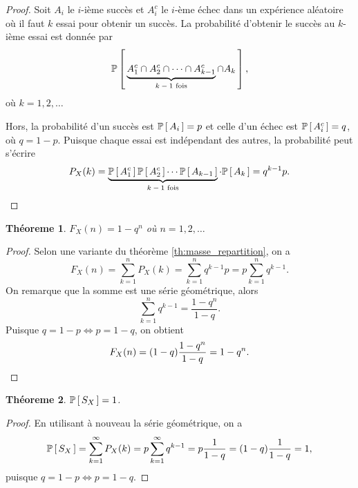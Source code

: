 \documentclass[11pt]{article}
\renewcommand\P[1]{%
	\ensuremath{%
		\mathbb{P}\left[\,#1\,\right]%
	}%
}%
\newtheorem{theoreme}{Théoreme}[section]
\begin{document}
\begin{proof}
	Soit $A_i$ le $i$-ième succès et $A_i^c$ le $i$-ème échec dans un
	expérience aléatoire où il faut $k$ essai pour obtenir un succès. La
	probabilité d'obtenir le succès au $k$-ième essai est donnée par
	\begin{equation*}
		\P{
			\underbrace{A_1^c\cap A_2^c\cap\cdots\cap A_{k-1}^c}_
			\text{$k-1$ fois}\cap A_k
		},
	\end{equation*}
	où $k=1,2,\dots$

	Hors, la probabilité d'un succès est $\P{A_i}=p$ et celle d'un échec
	est $\P{A_i^c}=q$, où $q=1-p$. Puisque chaque essai est indépendant des
	autres, la probabilité peut s'écrire
	\begin{equation*}
		P_X(k)=
		\underbrace{\P{A_1^c}\P{A_2^c}\cdots\P{A_{k-1}}}_\text{$k-1$ fois}
		\cdot\P{A_k}=q^{k-1}p.\qedhere
	\end{equation*}
\end{proof}

\begin{theoreme}\label{th:repartition_geo}
	$F_X(n)=1-q^n$ où $n=1,2,\dots$
\end{theoreme}

\begin{proof}
	Selon une variante du théorème \ref{th:masse_repartition}, on a
	\begin{equation*}
		F_X(n)=\sum_{k=1}^nP_X(k)=\sum_{k=1}^nq^{k-1}p=p\sum_{k=1}^nq^{k-1}.
	\end{equation*}
	On remarque que la somme est une série géométrique, alors
	\begin{equation*}
		\sum_{k=1}^nq^{k-1}=\frac{1-q^n}{1-q}.
	\end{equation*}
	Puisque $q=1-p\Leftrightarrow p=1-q$, on obtient
	\begin{equation*}
		F_X(n)=(1-q)\frac{1-q^n}{1-q}=1-q^n.\qedhere
	\end{equation*}
\end{proof}

\begin{theoreme}
	$\P{S_X}=1$.
\end{theoreme}

\begin{proof}
	En utilisant à nouveau la série géométrique, on a
	\begin{equation*}
		\P{S_X}
		=\sum_{k=1}^\infty P_X(k)
		=p\sum_{k=1}^\infty q^{k-1}
		=p\frac{1}{1-q}
		=(1-q)\frac{1}{1-q}
		=1,
	\end{equation*}
	puisque $q=1-p\Leftrightarrow p=1-q$.
\end{proof}
\end{document}
